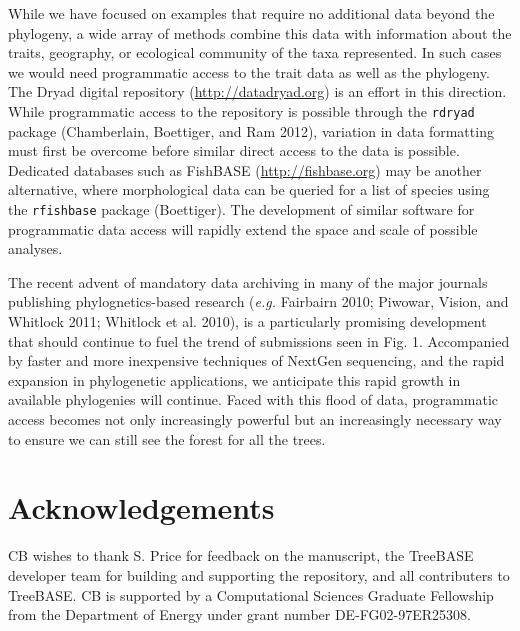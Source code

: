 While we have focused on examples that require no additional data beyond
the phylogeny, a wide array of methods combine this data with
information about the traits, geography, or ecological community of the
taxa represented. In such cases we would need programmatic access to the
trait data as well as the phylogeny. The Dryad digital repository
(\href{http://datadryad.org}{http://datadryad.org}) is an effort in this
direction. While programmatic access to the repository is possible
through the \texttt{rdryad} package (Chamberlain, Boettiger, and Ram
2012), variation in data formatting must first be overcome before
similar direct access to the data is possible. Dedicated databases such
as FishBASE (\href{http://fishbase.org}{http://fishbase.org}) may be
another alternative, where morphological data can be queried for a list
of species using the \texttt{rfishbase} package (Boettiger). The
development of similar software for programmatic data access will
rapidly extend the space and scale of possible analyses.

The recent advent of mandatory data archiving in many of the major
journals publishing phylognetics-based research (\emph{e.g.} Fairbairn
2010; Piwowar, Vision, and Whitlock 2011; Whitlock et al. 2010), is a
particularly promising development that should continue to fuel the
trend of submissions seen in Fig. 1. Accompanied by faster and more
inexpensive techniques of NextGen sequencing, and the rapid expansion in
phylogenetic applications, we anticipate this rapid growth in available
phylogenies will continue. Faced with this flood of data, programmatic
access becomes not only increasingly powerful but an increasingly
necessary way to ensure we can still see the forest for all the trees.

\section{Acknowledgements}

CB wishes to thank S. Price for feedback on the manuscript, the TreeBASE
developer team for building and supporting the repository, and all
contributers to TreeBASE. CB is supported by a Computational Sciences
Graduate Fellowship from the Department of Energy under grant number
DE-FG02-97ER25308.






